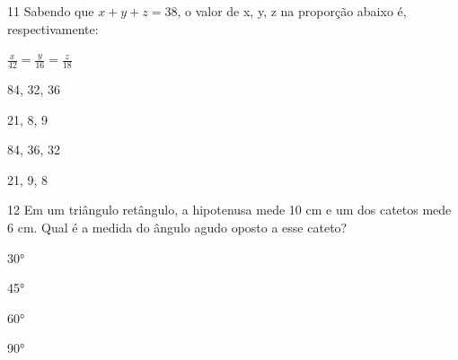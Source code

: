 \num{11} Sabendo que $x + y + z = 38$, o valor de x, y, z na proporção
abaixo é, respectivamente:

$\frac{x}{42} = \frac{y}{16} = \frac{z}{18}$

\begin{escolha}
\item 84, 32, 36
\item 21, 8, 9
\item 84, 36, 32
\item 21, 9, 8
\end{escolha}



\num{12} Em um triângulo retângulo, a hipotenusa mede 10 cm e um dos catetos
mede 6 cm. Qual é a medida do ângulo agudo oposto a esse cateto?

\begin{escolha}
\item 30°
\item 45°
\item 60°
\item 90°
\end{escolha}



